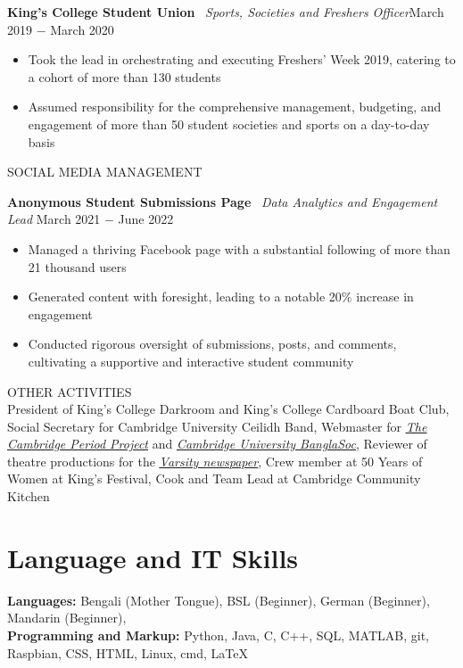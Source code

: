 \documentclass{article}
\begin{document}
\textbf{King's College Student Union} \
\textit{Sports, Societies and Freshers Officer}\hfill March 2019 $-$ March 2020
\begin{itemize}
    \item Took the lead in orchestrating and executing Freshers' Week 2019, catering to a cohort of more than 130 students
    \item Assumed responsibility for the comprehensive management, budgeting, and engagement of more than 50 student societies and sports on a day-to-day basis
\end{itemize} \medskip

\uppercase{Social Media Management}

\textbf{Anonymous Student Submissions Page} \
\textit{Data Analytics and Engagement Lead} \hfill March 2021 $-$ June 2022
\begin{itemize}
    \item Managed a thriving Facebook page with a substantial following of more than 21 thousand users
    \item Generated content with foresight, leading to a notable 20\% increase in engagement
    \item Conducted rigorous oversight of submissions, posts, and comments, cultivating a supportive and interactive student community
\end{itemize} \medskip

\uppercase{Other Activities}\\
President of King's College Darkroom and King's College Cardboard Boat Club, Social Secretary for Cambridge University Ceilidh Band, Webmaster for \href{http://tcpp.soc.srcf.net/}{\underline{\textit{The Cambridge Period Project}}} and \href{https://cambridgebanglasoc.org/}{\underline{\textit{Cambridge University BanglaSoc}}}, Reviewer of theatre productions for the \href{https://www.varsity.co.uk/profile/sheamol-obeda}{\underline{\textit{Varsity newspaper}}}, Crew member at 50 Years of Women at King's Festival, Cook and Team Lead at Cambridge Community Kitchen

\medskip

\vspace{-.75\baselineskip}
\hrulefill
\vspace{-.75\baselineskip}

\section*{Language and IT Skills}
\textbf{Languages:} Bengali (Mother Tongue), 
BSL (Beginner), German (Beginner), Mandarin (Beginner),  \\
\textbf{Programming and Markup:} Python, Java, C, C++, SQL, MATLAB, git, Raspbian, CSS, HTML, Linux, cmd, \LaTeX\medskip
\end{document}
